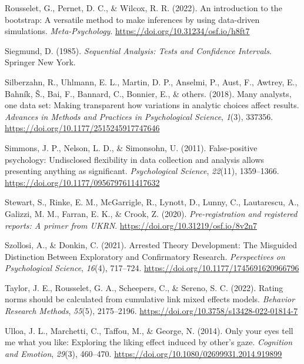 \documentclass[
  man]{apa7}
\newlength{\cslhangindent}
\newenvironment{CSLReferences}[2] %
 {\begin{list}{}{%
  \setlength{\itemindent}{0pt}
  \setlength{\leftmargin}{0pt}
  \setlength{\parsep}{0pt}
  \ifodd #1
   \setlength{\leftmargin}{\cslhangindent}
   \setlength{\itemindent}{-1\cslhangindent}
  \fi
  \setlength{\itemsep}{#2\baselineskip}}}
 {\end{list}}
\begin{document}
\begin{CSLReferences}{1}{0}
Rousselet, G., Pernet, D. C., \& Wilcox, R. R. (2022). An introduction to the bootstrap: A versatile method to make inferences by using data-driven simulations. \emph{Meta-Psychology}. \url{https://doi.org/10.31234/osf.io/h8ft7}

Siegmund, D. (1985). \emph{Sequential Analysis: Tests and Confidence Intervals}. Springer New York.

Silberzahn, R., Uhlmann, E. L., Martin, D. P., Anselmi, P., Aust, F., Awtrey, E., Bahník, Š., Bai, F., Bannard, C., Bonnier, E., \& others. (2018). Many analysts, one data set: Making transparent how variations in analytic choices affect results. \emph{Advances in Methods and Practices in Psychological Science}, \emph{1}(3), 337356. \url{https://doi.org/10.1177/2515245917747646}

Simmons, J. P., Nelson, L. D., \& Simonsohn, U. (2011). False-positive psychology: Undisclosed flexibility in data collection and analysis allows presenting anything as significant. \emph{Psychological Science}, \emph{22}(11), 1359--1366. \url{https://doi.org/10.1177/0956797611417632}

Stewart, S., Rinke, E. M., McGarrigle, R., Lynott, D., Lunny, C., Lautarescu, A., Galizzi, M. M., Farran, E. K., \& Crook, Z. (2020). \emph{Pre-registration and registered reports: A primer from UKRN}. \url{https://doi.org/10.31219/osf.io/8v2n7}

Szollosi, A., \& Donkin, C. (2021). Arrested Theory Development: The Misguided Distinction Between Exploratory and Confirmatory Research. \emph{Perspectives on Psychological Science}, \emph{16}(4), 717--724. \url{https://doi.org/10.1177/1745691620966796}

Taylor, J. E., Rousselet, G. A., Scheepers, C., \& Sereno, S. C. (2022). Rating norms should be calculated from cumulative link mixed effects models. \emph{Behavior Research Methods}, \emph{55}(5), 2175--2196. \url{https://doi.org/10.3758/s13428-022-01814-7}

Ulloa, J. L., Marchetti, C., Taffou, M., \& George, N. (2014). Only your eyes tell me what you like: Exploring the liking effect induced by other's gaze. \emph{Cognition and Emotion}, \emph{29}(3), 460--470. \url{https://doi.org/10.1080/02699931.2014.919899}


\end{CSLReferences}
\end{document}
